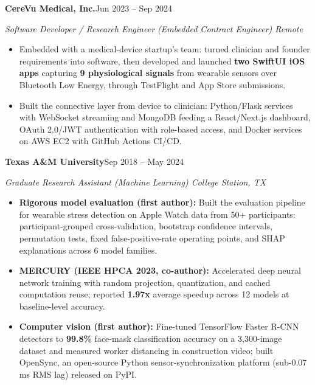 \documentclass[letterpaper,10pt]{article}
\newcommand{\role}[3]{\par\addvspace{3pt}\needspace{5\baselineskip}\textbf{#1}\hfill #3\par{\itshape #2}\par}
\begin{document}
\role{CereVu Medical, Inc.}{Software Developer / Research Engineer (Embedded Contract Engineer) \textbar{} Remote}{Jun 2023 -- Sep 2024}
\begin{itemize}
\item Embedded with a medical-device startup's team: turned clinician and founder requirements into software, then developed and launched \textbf{two SwiftUI iOS apps} capturing \textbf{9 physiological signals} from wearable sensors over Bluetooth Low Energy, through TestFlight and App Store submissions.
\item Built the connective layer from device to clinician: Python/Flask services with WebSocket streaming and MongoDB feeding a React/Next.js dashboard, OAuth 2.0/JWT authentication with role-based access, and Docker services on AWS EC2 with GitHub Actions CI/CD.
\end{itemize}

\role{Texas A\&M University}{Graduate Research Assistant (Machine Learning) \textbar{} College Station, TX}{Sep 2018 -- May 2024}
\begin{itemize}
\item \textbf{Rigorous model evaluation (first author):} Built the evaluation pipeline for wearable stress detection on Apple Watch data from 50+ participants: participant-grouped cross-validation, bootstrap confidence intervals, permutation tests, fixed false-positive-rate operating points, and SHAP explanations across 6 model families.
\item \textbf{MERCURY (IEEE HPCA 2023, co-author):} Accelerated deep neural network training with random projection, quantization, and cached computation reuse; reported \textbf{1.97x} average speedup across 12 models at baseline-level accuracy.
\item \textbf{Computer vision (first author):} Fine-tuned TensorFlow Faster R-CNN detectors to \textbf{99.8\%} face-mask classification accuracy on a 3,300-image dataset and measured worker distancing in construction video; built OpenSync, an open-source Python sensor-synchronization platform (sub-0.07 ms RMS lag) released on PyPI.
\end{itemize}
\end{document}
